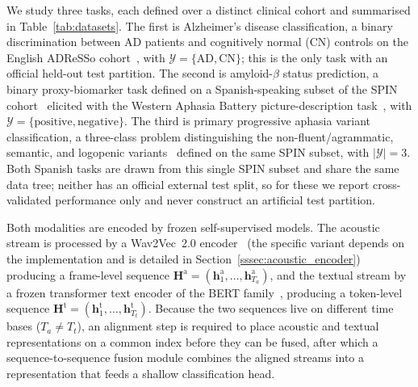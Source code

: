 \documentclass[a4paper,12pt]{article}
\begin{document}
We study three tasks, each defined over a distinct clinical cohort and summarised in Table~\ref{tab:datasets}. The first is Alzheimer's disease classification, a binary discrimination between AD patients and cognitively normal (CN) controls on the English ADReSSo cohort~\cite{luz2021adresso}, with $\mathcal{Y} = \{\mathrm{AD}, \mathrm{CN}\}$; this is the only task with an official held-out test partition. The second is amyloid-$\beta$ status prediction, a binary proxy-biomarker task defined on a Spanish-speaking subset of the SPIN cohort~\cite{alcolea2019spin} elicited with the Western Aphasia Battery picture-description task~\cite{kertesz1982wab}, with $\mathcal{Y} = \{\mathrm{positive}, \mathrm{negative}\}$. The third is primary progressive aphasia variant classification, a three-class problem distinguishing the non-fluent/agrammatic, semantic, and logopenic variants~\cite{gorno2011ppa} defined on the same SPIN subset, with $|\mathcal{Y}| = 3$. Both Spanish tasks are drawn from this single SPIN subset and share the same data tree; neither has an official external test split, so for these we report cross-validated performance only and never construct an artificial test partition.

Both modalities are encoded by frozen self-supervised models. The acoustic stream is processed by a Wav2Vec~2.0 encoder~\cite{baevski2020wav2vec} (the specific variant depends on the implementation and is detailed in Section~\ref{sssec:acoustic_encoder}) producing a frame-level sequence $\mathbf{H}^{\mathrm{a}} = (\mathbf{h}^{\mathrm{a}}_1, \dots, \mathbf{h}^{\mathrm{a}}_{T_a})$, and the textual stream by a frozen transformer text encoder of the BERT family~\cite{devlin2019bert}, producing a token-level sequence $\mathbf{H}^{\mathrm{t}} = (\mathbf{h}^{\mathrm{t}}_1, \dots, \mathbf{h}^{\mathrm{t}}_{T_t})$. Because the two sequences live on different time bases ($T_a \neq T_t$), an alignment step is required to place acoustic and textual representations on a common index before they can be fused, after which a sequence-to-sequence fusion module combines the aligned streams into a representation that feeds a shallow classification head.
\end{document}
